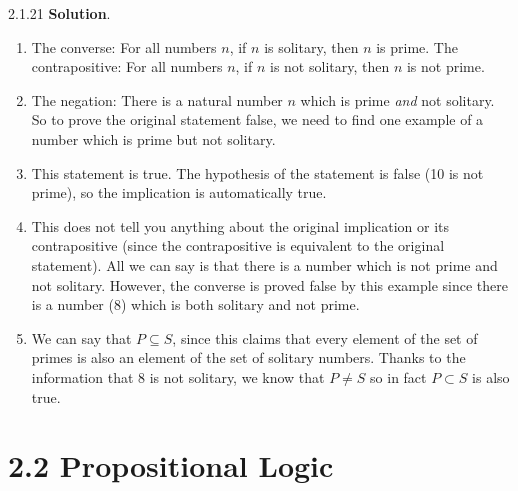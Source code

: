 \documentclass[11pt,]{book}
\theoremstyle{ptxplainnotitle}
\theoremstyle{ptxplaintitle}
\theoremstyle{ptxdefinitionnotitle}
\theoremstyle{ptxdefinitiontitle}
\theoremstyle{ptxdefinitionnotitle}
\theoremstyle{ptxdefinitiontitle}
\theoremstyle{ptxdefinitionnotitle}
\theoremstyle{ptxdefinitiontitle}
\theoremstyle{ptxdefinitiontitlenonumber}
\theoremstyle{ptxdefinitiontitlenonumber}
\numberwithin{equation}{chapter}
\begin{document}
\begin{divisionexercise}{2.1.21}
\textbf{Solution}.\quad%
\hypertarget{p-2354}{}%
\leavevmode%
\begin{enumerate}[label=(\alph*)]
\item\hypertarget{li-1236}{}\hypertarget{p-2355}{}%
The converse: For all numbers \(n\), if \(n\) is solitary, then \(n\) is prime.  The contrapositive: For all numbers \(n\), if \(n\) is not solitary, then \(n\) is not prime.%
\item\hypertarget{li-1237}{}\hypertarget{p-2356}{}%
The negation: There is a natural number \(n\) which is prime \emph{and} not solitary.  So to prove the original statement false, we need to find one example of a number which is prime but not solitary.%
\item\hypertarget{li-1238}{}\hypertarget{p-2357}{}%
This statement is true.  The hypothesis of the statement is false (10 is not prime), so the implication is automatically true.%
\item\hypertarget{li-1239}{}\hypertarget{p-2358}{}%
This does not tell you anything about the original implication or its contrapositive (since the contrapositive is equivalent to the original statement).  All we can say is that there is a number which is not prime and not solitary.  However, the converse is proved false by this example since there is a number (8) which is both solitary and not prime.%
\item\hypertarget{li-1240}{}\hypertarget{p-2359}{}%
We can say that \(P \subseteq S\), since this claims that every element of the set of primes is also an element of the set of solitary numbers.  Thanks to the information that 8 is not solitary, we know that \(P \ne S\) so in fact \(P \subset S\) is also true.%
\end{enumerate}
%
\end{divisionexercise}%
\section*{2.2 Propositional Logic}
\end{document}
